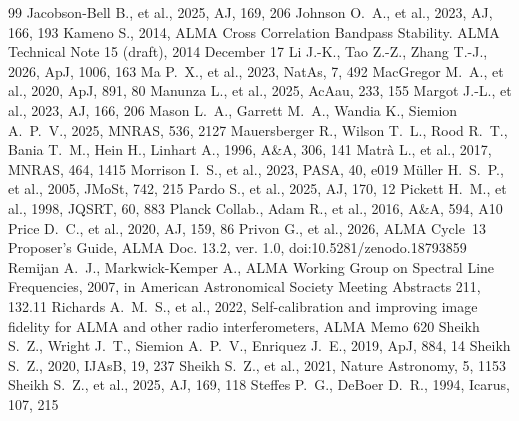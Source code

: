 \documentclass[twocolumn,twocolappendix,numberedappendix,appendixfloats]{openjournal}
\begin{document}
\begin{thebibliography}{99}
 Jacobson-Bell B., et al., 2025, AJ, 169, 206
 Johnson O.~A., et al., 2023, AJ, 166, 193
 Kameno S., 2014, ALMA Cross Correlation Bandpass Stability. ALMA Technical Note 15 (draft), 2014 December 17
 Li J.-K., Tao Z.-Z., Zhang T.-J., 2026, ApJ, 1006, 163
 Ma P.~X., et al., 2023, NatAs, 7, 492
 MacGregor M.~A., et al., 2020, ApJ, 891, 80
 Manunza L., et al., 2025, AcAau, 233, 155
 Margot J.-L., et al., 2023, AJ, 166, 206
 Mason L.~A., Garrett M.~A., Wandia K., Siemion A.~P.~V., 2025, MNRAS, 536, 2127
 Mauersberger R., Wilson T.~L., Rood R.~T., Bania T.~M., Hein H., Linhart A., 1996, A\&A, 306, 141
 Matrà L., et al., 2017, MNRAS, 464, 1415
 Morrison I.~S., et al., 2023, PASA, 40, e019
 M\"uller H.~S.~P., et al., 2005, JMoSt, 742, 215
 Pardo S., et al., 2025, AJ, 170, 12
 Pickett H.~M., et al., 1998, JQSRT, 60, 883
 Planck Collab., Adam R., et al., 2016, A\&A, 594, A10
 Price D.~C., et al., 2020, AJ, 159, 86
 Privon G., et al., 2026, ALMA Cycle~13 Proposer's Guide, ALMA Doc. 13.2, ver. 1.0, doi:10.5281/zenodo.18793859
 Remijan A.~J., Markwick-Kemper A., ALMA Working Group on Spectral Line Frequencies, 2007, in American Astronomical Society Meeting Abstracts 211, 132.11
 Richards A.~M.~S., et al., 2022, Self-calibration and improving image fidelity for ALMA and other radio interferometers, ALMA Memo 620
 Sheikh S.~Z., Wright J.~T., Siemion A.~P.~V., Enriquez J.~E., 2019, ApJ, 884, 14
 Sheikh S.~Z., 2020, IJAsB, 19, 237
 Sheikh S.~Z., et al., 2021, Nature Astronomy, 5, 1153
 Sheikh S.~Z., et al., 2025, AJ, 169, 118
 Steffes P.~G., DeBoer D.~R., 1994, Icarus, 107, 215

\end{thebibliography}
\end{document}
